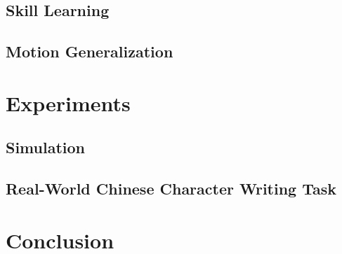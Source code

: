 \documentclass[journal]{IEEEtran}
\begin{document}
\subsection{Skill Learning}

\subsection{Motion Generalization}

\section{Experiments}
\subsection{Simulation}


\subsection{Real-World Chinese Character Writing Task}


\section{Conclusion}





\end{document}

